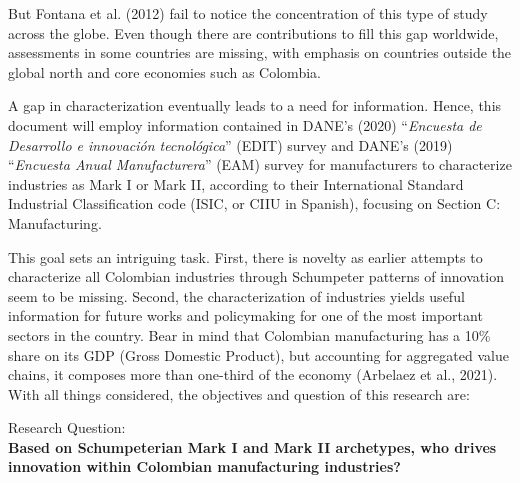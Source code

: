 \documentclass[12pt,a4paper]{article}
\begin{document}
But Fontana et al. (2012) fail to notice the concentration of this type of study across the globe. Even though there are contributions to fill this gap worldwide, assessments in some countries are missing, with emphasis on countries outside the global north and core economies such as Colombia.   

A gap in characterization eventually leads to a need for information. Hence, this document will employ information contained in DANE's (2020) “\textit{Encuesta de Desarrollo e innovación tecnológica}” (EDIT) survey and DANE's (2019) “\textit{Encuesta Anual Manufacturera}” (EAM) survey for manufacturers to characterize industries as Mark I or Mark II, according to their International Standard Industrial Classification code (ISIC, or CIIU in Spanish), focusing on Section C: Manufacturing.  

This goal sets an intriguing task. First, there is novelty as earlier attempts to characterize all Colombian industries through Schumpeter patterns of innovation seem to be missing. Second, the characterization of industries yields useful information for future works and policymaking for one of the most important sectors in the country. Bear in mind that Colombian manufacturing has a 10\% share on its GDP (Gross Domestic Product), but accounting for aggregated value chains, it composes more than one-third of the economy (Arbelaez et al., 2021). With all things considered, the objectives and question of this research are: 



\begin{center}
	Research Question: \\  \textbf{Based on Schumpeterian Mark I and Mark II archetypes, who drives innovation within Colombian manufacturing industries?}
\end{center}
\end{document}
